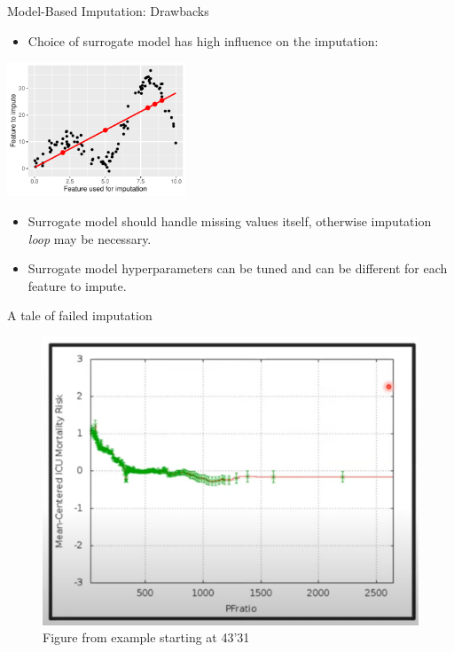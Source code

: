 \documentclass[11pt,compress,t,notes=noshow, xcolor=table]{beamer}
\begin{document}
\begin{frame}{Model-Based Imputation: Drawbacks}

    \begin{itemize}
        \item Choice of surrogate model has high influence on the imputation:
    \end{itemize}
    
    \begin{center}
        \includegraphics[width=0.4\textwidth]{figure/surrogate_model_influence}
    \end{center}
    
    \begin{itemize}
        \item Surrogate model should handle missing values itself, otherwise imputation \textit{loop} may be necessary.
        
        \item Surrogate model hyperparameters can be tuned and can be different for each feature to impute.
    \end{itemize}

\end{frame}

\begin{frame}{A tale of failed imputation}
\vfill
\begin{figure}
    \centering
    \includegraphics[width=0.5\linewidth]{figure_man/Screenshot from 2025-06-03 22-38-17.png}
    \caption{Figure from  example starting at 43'31}
\end{figure}
\vfill
\end{frame}
\end{document}
